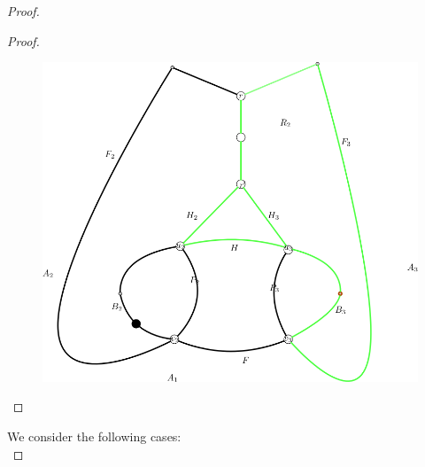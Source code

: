 \documentclass[letterpaper,11pt]{article}
\newcommand{\0}{\mathbb{0}}
\newcommand{\1}{\mathbb{1}}
\begin{document}
\begin{proof}
\begin{proof}
\begin{figure}
      \includegraphics[scale=0.23]{Case1Contr3.png}
    \caption{}
    \label{case1contra3}
\end{figure}
\end{proof}

 We consider the following cases:\\






\end{proof}
\end{document}
